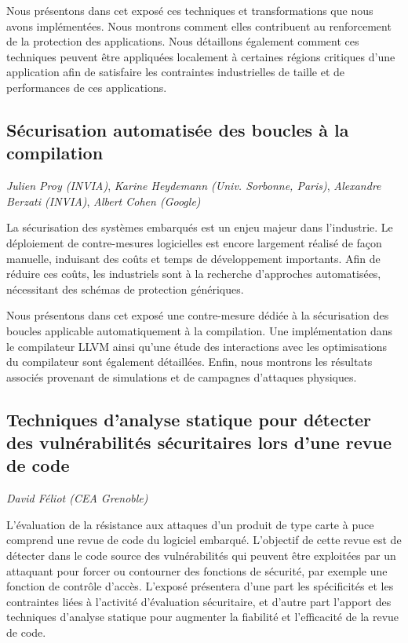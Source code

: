 \documentclass[a4paper,11pt]{article}
\begin{document}
Nous présentons dans cet exposé ces techniques et transformations que
nous avons implémentées. Nous montrons comment elles contribuent au
renforcement de la protection des applications. Nous détaillons
également comment ces techniques peuvent être appliquées localement à
certaines régions critiques d'une application afin de satisfaire les
contraintes industrielles de taille et de performances de ces applications.

\subsection{Sécurisation automatisée des boucles à la compilation}
\label{sec:org41b4c9c}
\emph{Julien Proy (INVIA)},
\emph{Karine Heydemann (Univ. Sorbonne, Paris)},
\emph{Alexandre Berzati (INVIA)},
\emph{Albert Cohen (Google)}

La sécurisation des systèmes embarqués est un enjeu majeur dans l'industrie.
Le déploiement de contre-mesures logicielles est encore largement réalisé de façon manuelle, induisant des coûts et temps de développement importants.
Afin de réduire ces coûts, les industriels sont à la recherche d'approches automatisées, nécessitant des schémas de protection génériques.

Nous présentons dans cet exposé une contre-mesure dédiée à la sécurisation des boucles applicable automatiquement à la compilation.
Une implémentation dans le compilateur LLVM ainsi qu'une étude des interactions avec les optimisations du compilateur sont également détaillées.
Enfin, nous montrons les résultats associés provenant de simulations et de campagnes d'attaques physiques.

\subsection{Techniques d'analyse statique pour détecter des vulnérabilités sécuritaires lors d'une revue de code}
\label{sec:org75eef01}
\emph{David Féliot (CEA Grenoble)}

L'évaluation de la résistance aux attaques d'un produit de type carte à puce comprend une revue de code du logiciel embarqué. L'objectif de cette revue est de détecter dans le code source des vulnérabilités qui peuvent être exploitées par un attaquant pour forcer ou contourner des fonctions de sécurité, par exemple une fonction de contrôle d'accès. L'exposé présentera d'une part les spécificités et les contraintes liées à l'activité d'évaluation sécuritaire, et d'autre part l'apport des techniques d'analyse statique pour augmenter la fiabilité et l'efficacité de la revue de code.
\end{document}
